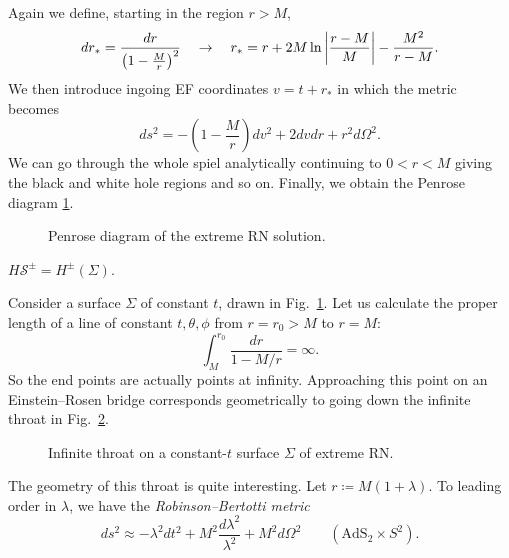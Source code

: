 Again we define, starting in the region $r > M$,
\begin{equation}
  dr_* = \frac{dr}{\left( 1 - \frac{M}{r} \right)^2} 
  \quad  \rightarrow \quad r_* = r + 2M \ln \abs{\frac{r - M}{M}} - \frac{M^2}{r - M}.
\end{equation}
We then introduce ingoing EF coordinates $v = t + r_*$ in which the metric becomes
\begin{equation}
  ds^2 = - \left( 1 - \frac{M}{r} \right) dv^2 + 2 d v d r + r^2 d\Omega^2.
\end{equation}
We can go through the whole spiel analytically continuing to $0 < r < M$ giving the black and white hole regions and so on.
Finally, we obtain the Penrose diagram \ref{fig:l14f8}.
\begin{figure}[tbhp]
  \centering
  \def\svgwidth{0.4\columnwidth}
  
  \caption{Penrose diagram of the extreme RN solution.}
  \label{fig:l14f8}
\end{figure}

\begin{remark}
  $H\mathcal{S}^{\pm} = H^{\pm}(\Sigma)$.
\end{remark}

Consider a surface $\Sigma$ of constant $t$, drawn in Fig.~\ref{fig:l14f8}. Let us calculate the proper length of a line of constant $t, \theta, \phi$ from $r = r_0 > M$ to $r = M$:
\begin{equation}
  \int_M^{r_0} \frac{dr}{1 - M / r} = \infty.
\end{equation}
So the end points are actually points at infinity.
Approaching this point on an Einstein--Rosen bridge corresponds geometrically to going down the infinite throat in Fig.~\ref{fig:l14f9}.
\begin{figure}[htbp]
  \centering
  \caption{Infinite throat on a constant-$t$ surface $\Sigma$ of extreme RN.}
  \label{fig:l14f9}
\end{figure}

The geometry of this throat is quite interesting. Let $r \coloneqq M (1 + \lambda)$. To leading order in $\lambda$, we have the \emph{Robinson--Bertotti metric}
\begin{equation}
  ds^2 \approx - \lambda^2 dt^2 + M^2 \frac{d\lambda^2}{\lambda^2} + M^2 d\Omega^2 \qquad (\text{AdS}_2 \times S^2).
\end{equation}
